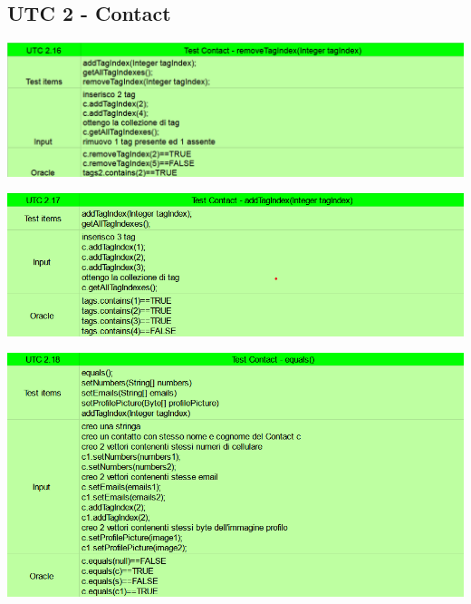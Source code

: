 \subsection{UTC 2 - Contact}
\begin{center} \includegraphics[width=\linewidth]{images/UTC/2-16.png} \end{center}
\begin{center} \includegraphics[width=\linewidth]{images/UTC/2-17.png} \end{center}
\begin{center} \includegraphics[width=\linewidth]{images/UTC/2-18.png} \end{center}

